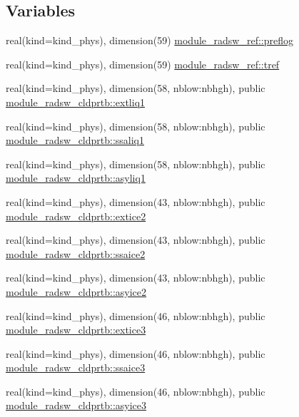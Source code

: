 \subsection*{Variables}
\begin{DoxyCompactItemize}
\item 
real(kind=kind\+\_\+phys), dimension(59) \hyperlink{namespacemodule__radsw__ref_afb71559d084ca709bd134e6c489035e2}{module\+\_\+radsw\+\_\+ref\+::preflog}
\item 
real(kind=kind\+\_\+phys), dimension(59) \hyperlink{group__module__radsw__main_ga449fffa7047caa0fba6c166c26f7dbbd}{module\+\_\+radsw\+\_\+ref\+::tref}
\item 
real(kind=kind\+\_\+phys), dimension(58, nblow\+:nbhgh), public \hyperlink{namespacemodule__radsw__cldprtb_ac68593a33577c720ca8c74eafb3c9f96}{module\+\_\+radsw\+\_\+cldprtb\+::extliq1}
\item 
real(kind=kind\+\_\+phys), dimension(58, nblow\+:nbhgh), public \hyperlink{group__module__radsw__main_ga7944084ba9f240723dc93467ec66f825}{module\+\_\+radsw\+\_\+cldprtb\+::ssaliq1}
\item 
real(kind=kind\+\_\+phys), dimension(58, nblow\+:nbhgh), public \hyperlink{group__module__radsw__main_ga430be0720aa2e2ac46aa1ec7c9a9b64b}{module\+\_\+radsw\+\_\+cldprtb\+::asyliq1}
\item 
real(kind=kind\+\_\+phys), dimension(43, nblow\+:nbhgh), public \hyperlink{group__module__radsw__main_ga8ed403302034ea073243157749673e14}{module\+\_\+radsw\+\_\+cldprtb\+::extice2}
\item 
real(kind=kind\+\_\+phys), dimension(43, nblow\+:nbhgh), public \hyperlink{group__module__radsw__main_ga48555ff54d3a46f8c49733ff82e94d70}{module\+\_\+radsw\+\_\+cldprtb\+::ssaice2}
\item 
real(kind=kind\+\_\+phys), dimension(43, nblow\+:nbhgh), public \hyperlink{group__module__radsw__main_gad9328ffc5e90cc62c8c9c5089b55fc79}{module\+\_\+radsw\+\_\+cldprtb\+::asyice2}
\item 
real(kind=kind\+\_\+phys), dimension(46, nblow\+:nbhgh), public \hyperlink{group__module__radsw__main_ga8b8bae831aa5b460e260c94e7f24f4c7}{module\+\_\+radsw\+\_\+cldprtb\+::extice3}
\item 
real(kind=kind\+\_\+phys), dimension(46, nblow\+:nbhgh), public \hyperlink{group__module__radsw__main_ga39b045b05e6bc9c04603277654ff8fc6}{module\+\_\+radsw\+\_\+cldprtb\+::ssaice3}
\item 
real(kind=kind\+\_\+phys), dimension(46, nblow\+:nbhgh), public \hyperlink{group__module__radsw__main_gaec2685be0de3a557aca169062cf1055e}{module\+\_\+radsw\+\_\+cldprtb\+::asyice3}

\end{DoxyCompactItemize}
